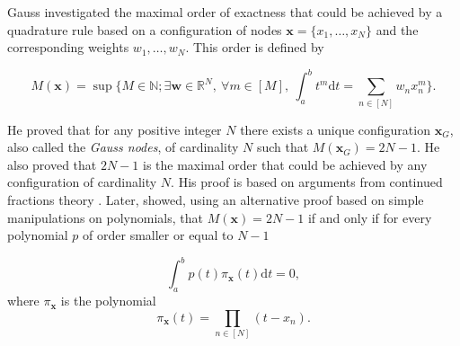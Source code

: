 \documentclass[twoside,11pt]{book}
\numberwithin{theorem}{chapter}
\numberwithin{definition}{chapter}
\numberwithin{proposition}{chapter}
\numberwithin{corollary}{chapter}
\numberwithin{example}{chapter}
\numberwithin{lemma}{chapter}
\numberwithin{assumption}{chapter}
\begin{document}
 Gauss investigated the maximal order of exactness that could be achieved by a quadrature rule based on a configuration of nodes $\bm{x} = \{ x_{1}, \dots, x_{N} \}$ and the corresponding weights $w_{1}, \dots, w_{N}$. This order is defined by 

\begin{equation}
M(\bm{x}) = \sup \bigg\{ M \in \mathbb{N}; \exists \bm{w} \in \mathbb{R}^{N}, \: \forall m \in [M], \: \int_{a}^{b} t^{m} \mathrm{d}t = \sum\limits_{n \in [N]} w_{n}x_{n}^{m} \bigg\}.
\end{equation}





He proved that for any positive integer $N$ there exists a unique configuration $\bm{x}_{G}$, also called the \emph{Gauss nodes}, of cardinality $N$ such that $M(\bm{x}_{G}) = 2N-1$. He also proved that $2N-1$ is the maximal order that could be achieved by any configuration of cardinality $N$. His proof \citep{Gau1815} is based on arguments from continued fractions theory \citep{Khi97}.
Later, \cite{Jac1826} showed, using an alternative proof based on simple manipulations on polynomials, that $M(\bm{x}) = 2N-1$ if and only if for every polynomial $p$ of order smaller or equal to $N-1$

\begin{equation}\label{eq:Legendre_orthogonality}
\int_{a}^{b} p(t) \pi_{\bm{x}}(t) \mathrm{d}t = 0,
\end{equation}
where $\pi_{\bm{x}}$ is the polynomial
\begin{equation}
\pi_{\bm{x}}(t) = \prod\limits_{n \in [N]}(t-x_{n}).
\end{equation}

\end{document}
